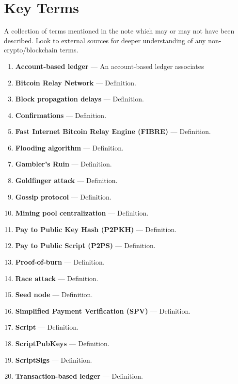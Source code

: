 \documentclass[full.tex]{subfiles}
\begin{document}
    \section*{Key Terms}
    \noindent A collection of terms mentioned in the note which may or may not have been described. Look to external sources for deeper understanding of any non-crypto/blockchain terms.
    \begin{enumerate}
        \item \textbf{Account-based ledger} --- An account-based ledger associates 
        \item \textbf{Bitcoin Relay Network} --- Definition.
        \item \textbf{Block propagation delays} --- Definition.
        \item \textbf{Confirmations} --- Definition.
        \item \textbf{Fast Internet Bitcoin Relay Engine (FIBRE)} --- Definition.
        \item \textbf{Flooding algorithm} --- Definition.
        \item \textbf{Gambler's Ruin} --- Definition.
        \item \textbf{Goldfinger attack} --- Definition.
        \item \textbf{Gossip protocol} --- Definition.
        \item \textbf{Mining pool centralization} --- Definition.
        \item \textbf{Pay to Public Key Hash (P2PKH)} --- Definition.
        \item \textbf{Pay to Public Script (P2PS)} --- Definition.
        \item \textbf{Proof-of-burn} --- Definition.
        \item \textbf{Race attack} --- Definition.
        \item \textbf{Seed node} --- Definition.
        \item \textbf{Simplified Payment Verification (SPV)} --- Definition.
        \item \textbf{Script} --- Definition.
        \item \textbf{ScriptPubKeys} --- Definition.
        \item \textbf{ScriptSigs} --- Definition.
        \item \textbf{Transaction-based ledger} --- Definition.
    \end{enumerate}
\end{document}
